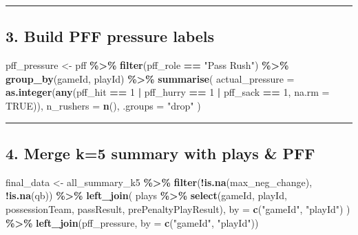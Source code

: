 \documentclass[
]{article}
\newenvironment{Shaded}{\begin{snugshade}}{\end{snugshade}}
\newcommand{\AttributeTok}[1]{\textcolor[rgb]{0.13,0.29,0.53}{#1}}
\newcommand{\ConstantTok}[1]{\textcolor[rgb]{0.56,0.35,0.01}{#1}}
\newcommand{\DecValTok}[1]{\textcolor[rgb]{0.00,0.00,0.81}{#1}}
\newcommand{\FunctionTok}[1]{\textcolor[rgb]{0.13,0.29,0.53}{\textbf{#1}}}
\newcommand{\NormalTok}[1]{#1}
\newcommand{\OtherTok}[1]{\textcolor[rgb]{0.56,0.35,0.01}{#1}}
\newcommand{\SpecialCharTok}[1]{\textcolor[rgb]{0.81,0.36,0.00}{\textbf{#1}}}
\newcommand{\StringTok}[1]{\textcolor[rgb]{0.31,0.60,0.02}{#1}}
\begin{document}
\begin{center}\rule{0.5\linewidth}{0.5pt}\end{center}

\subsection{3. Build PFF pressure
labels}\label{build-pff-pressure-labels}

\begin{Shaded}
\begin{Highlighting}[]
\NormalTok{pff\_pressure }\OtherTok{\textless{}{-}}\NormalTok{ pff }\SpecialCharTok{\%\textgreater{}\%}
  \FunctionTok{filter}\NormalTok{(pff\_role }\SpecialCharTok{==} \StringTok{"Pass Rush"}\NormalTok{) }\SpecialCharTok{\%\textgreater{}\%}
  \FunctionTok{group\_by}\NormalTok{(gameId, playId) }\SpecialCharTok{\%\textgreater{}\%}
  \FunctionTok{summarise}\NormalTok{(}
    \AttributeTok{actual\_pressure =} \FunctionTok{as.integer}\NormalTok{(}\FunctionTok{any}\NormalTok{(pff\_hit }\SpecialCharTok{==} \DecValTok{1} \SpecialCharTok{|}\NormalTok{ pff\_hurry }\SpecialCharTok{==} \DecValTok{1} \SpecialCharTok{|}\NormalTok{ pff\_sack }\SpecialCharTok{==} \DecValTok{1}\NormalTok{, }\AttributeTok{na.rm =} \ConstantTok{TRUE}\NormalTok{)),}
    \AttributeTok{n\_rushers       =} \FunctionTok{n}\NormalTok{(),}
    \AttributeTok{.groups =} \StringTok{"drop"}
\NormalTok{  )}
\end{Highlighting}
\end{Shaded}

\begin{center}\rule{0.5\linewidth}{0.5pt}\end{center}

\subsection{4. Merge k=5 summary with plays \&
PFF}\label{merge-k5-summary-with-plays-pff}

\begin{Shaded}
\begin{Highlighting}[]
\NormalTok{final\_data }\OtherTok{\textless{}{-}}\NormalTok{ all\_summary\_k5 }\SpecialCharTok{\%\textgreater{}\%}
  \FunctionTok{filter}\NormalTok{(}\SpecialCharTok{!}\FunctionTok{is.na}\NormalTok{(max\_neg\_change), }\SpecialCharTok{!}\FunctionTok{is.na}\NormalTok{(qb)) }\SpecialCharTok{\%\textgreater{}\%}
  \FunctionTok{left\_join}\NormalTok{(}
\NormalTok{    plays }\SpecialCharTok{\%\textgreater{}\%} \FunctionTok{select}\NormalTok{(gameId, playId, possessionTeam, passResult, prePenaltyPlayResult),}
    \AttributeTok{by =} \FunctionTok{c}\NormalTok{(}\StringTok{"gameId"}\NormalTok{, }\StringTok{"playId"}\NormalTok{)}
\NormalTok{  ) }\SpecialCharTok{\%\textgreater{}\%}
  \FunctionTok{left\_join}\NormalTok{(pff\_pressure, }\AttributeTok{by =} \FunctionTok{c}\NormalTok{(}\StringTok{"gameId"}\NormalTok{, }\StringTok{"playId"}\NormalTok{))}
\end{Highlighting}
\end{Shaded}
\end{document}
